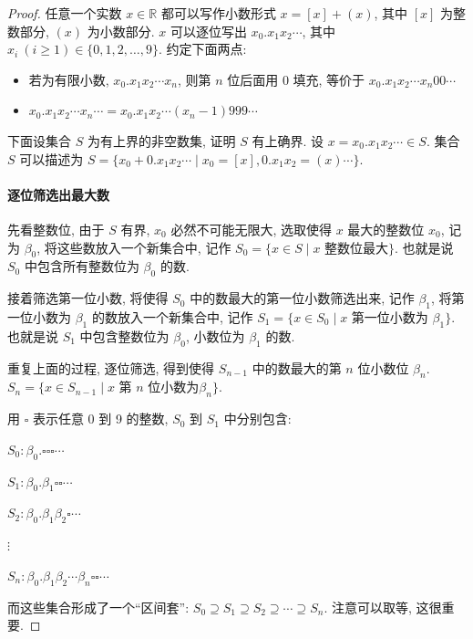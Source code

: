 \documentclass[UTF8]{ctexart}
\newcommand{\R}{\mathbb R}
\begin{document}
\begin{proof}
    任意一个实数 $ x \in \R $ 都可以写作小数形式 $ x = [x] + (x) $, 其中 $ [x] $ 为整数部分, $ (x) $ 为小数部分. $ x $ 可以逐位写出 $ x_0.x_1 x_2 \cdots $, 其中 $ x_i \ (i \geqslant 1) \in \{0, 1, 2, \dots, 9\} $. 约定下面两点:
    \begin{itemize}
        \item 若为有限小数, $ x_0.x_1 x_2 \cdots x_n $, 则第 $ n $ 位后面用 $ 0 $ 填充, 等价于 $ x_0.x_1 x_2 \cdots x_n 00 \cdots $
        \item $ x_0.x_1 x_2 \cdots x_n \cdots = x_0.x_1 x_2 \cdots (x_n - 1) 999 \cdots $
    \end{itemize}

    下面设集合 $ S $ 为有上界的非空数集, 证明 $ S $ 有上确界. 设 $ x = x_0.x_1 x_2 \cdots \in S $. 集合 $ S $ 可以描述为 $ S = \{ x_0 + 0.x_1 x_2 \cdots \mid x_0 = [x], 0.x_1 x_2 = (x) \cdots \} $.

    \paragraph{逐位筛选出最大数}
    先看整数位, 由于 $ S $ 有界, $ x_0 $ 必然不可能无限大, 选取使得 $ x $ 最大的整数位 $ x_0 $, 记为 $ \beta_0 $, 将这些数放入一个新集合中, 记作 $ S_0 = \{ x \in S \mid x \text{ 整数位最大} \} $. 也就是说 $ S_0 $ 中包含所有整数位为 $ \beta_0 $ 的数.

    接着筛选第一位小数, 将使得 $ S_0 $ 中的数最大的第一位小数筛选出来, 记作 $ \beta_1 $, 将第一位小数为 $ \beta_1 $ 的数放入一个新集合中, 记作 $ S_1 = \{ x \in S_0 \mid x \text{ 第一位小数为 } \beta_1 \} $. 也就是说 $ S_1 $ 中包含整数位为 $ \beta_0 $, 小数位为 $ \beta_1 $ 的数.

    重复上面的过程, 逐位筛选, 得到使得 $ S_{n - 1} $ 中的数最大的第 $ n $ 位小数位 $ \beta_n $. $ S_n = \{ x \in S_{n-1} \mid x \text{ 第 } n \text{ 位小数为} \beta_n \} $.

    用 $ \square $ 表示任意 0 到 9 的整数, $ S_0 $ 到 $ S_1 $ 中分别包含:

    $ S_0 : \beta_0.\square\square\square \cdots $

    $ S_1 : \beta_0.\beta_1 \square\square\cdots $

    $ S_2 : \beta_0.\beta_1\beta_2 \square \cdots $

    $ \vdots $

    $ S_n : \beta_0.\beta_1\beta_2 \cdots \beta_n \square\square \cdots $

    而这些集合形成了一个``区间套'': $ S_0 \supseteq S_1 \supseteq S_2 \supseteq \cdots \supseteq S_n $. 注意可以取等, 这很重要.


\end{proof}
\end{document}
